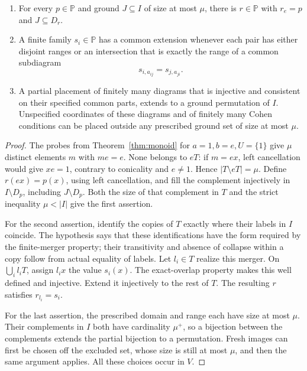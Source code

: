 \begin{lemma}
\label{lem:diagram-amalgamation}
\begin{enumerate}
\item
For every \(p\in\mathbb P\) and ground \(J\subseteq I\) of size at
most \(\mu\), there is \(r\in\mathbb P\) with
\(r_e=p\) and \(J\subseteq D_r\).
\item
A finite family \(s_i\in\mathbb P\) has a common extension whenever
each pair has either disjoint ranges or an intersection that is
exactly the range of a common subdiagram
\[
 s_{i,a_{ij}}=s_{j,a_{ji}}.
\]
\item
A partial placement of finitely many diagrams that is injective and
consistent on their
specified common parts, extends to a ground permutation of \(I\).
Unspecified coordinates of these diagrams and of finitely many Cohen
conditions can be placed outside any prescribed ground set of size
at most \(\mu\).
\end{enumerate}
\end{lemma}

\begin{proof}
The probes from Theorem~\ref{thm:monoid} for
\(a=1,b=e,U=\{1\}\) give \(\mu\) distinct elements \(m\) with
\(me=e\).  None belongs to \(eT\): if \(m=ex\), left cancellation
would give \(xe=1\), contrary to conicality and \(e\neq1\).
Hence \(|T\setminus eT|=\mu\).
Define \(r(ex)=p(x)\), using left cancellation, and fill the
complement injectively in \(I\setminus D_p\), including
\(J\setminus D_p\).  Both the size of that complement in \(T\)
and the strict inequality \(\mu<|I|\) give the first assertion.

For the second assertion, identify the copies of \(T\) exactly where
their labels in \(I\) coincide.  The hypothesis says that these
identifications have the form required by the finite-merger property;
their transitivity and absence of collapse within a copy follow from
actual equality of labels.  Let \(l_i\in T\) realize this merger.
On \(\bigcup_i l_iT\), assign \(l_ix\) the value \(s_i(x)\).
The exact-overlap property makes this well defined and injective.
Extend it injectively to the rest of \(T\).  The resulting \(r\)
satisfies \(r_{l_i}=s_i\).

For the last assertion, the prescribed domain and range each have
size at most \(\mu\).  Their complements in \(I\) both have
cardinality \(\mu^+\), so a bijection between the complements
extends the partial bijection to a permutation.
Fresh images can first be chosen off the excluded set, whose size
is still at most \(\mu\), and then the same argument applies.
All these choices occur in \(V\).
\end{proof}

